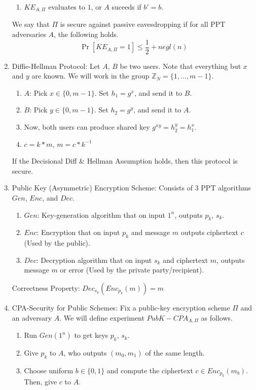 \documentclass[12pt,letterpaper]{article}
\begin{document}
\begin{enumerate}
\begin{enumerate}
   			\item $KE_{A,\Pi}$ evaluates to $1$, or $A$ suceeds if $b'=b$.
   		\end{enumerate}
   		We say that $\Pi$ is secure against passive eavesdropping if for all PPT adversaries $A$, the following holds.
   		\[\Pr[KE_{A,\Pi}=1]\leq\frac{1}{2}+negl(n)\]\newpage
   		\item Diffie-Hellman Protocol: Let $A$, $B$ be two users. Note that everything but $x$ and $y$ are known. We will work in the group $\mathbb{Z}_N=\{1,\ldots,m-1\}$.
   		\begin{enumerate}
   			\item $A$: Pick $x\in\{0,m-1\}$. Set $h_1=g^x$, and send it to $B$.
   			\item $B$: Pick $y\in\{0,m-1\}$. Set $h_2=g^y$, and send it to $A$.
   			\item Now, both users can produce shared key $g^{xy}=h_2^y=h_1^x$.
   			\item $c=k*m$, $m=c*k^{-1}$
   		\end{enumerate}
   		If the Decisional Diff \& Hellman Assumption holds, then this protocol is secure.
   		\item Public Key (Asymmetric) Encryption Scheme: Consists of 3 PPT algorithms $Gen$, $Enc$, and $Dec$.
   		\begin{enumerate}
   			\item $Gen$: Key-generation algorithm that on input $1^n$, outputs $p_k$, $s_k$.
   			\item $Enc$: Encryption that on input $p_k$ and message $m$ outputs ciphertext $c$ (Used by the public).
   			\item $Dec$: Decryption algorithm that on input $s_k$ and ciphertext $m$, outputs message $m$ or error (Used by the private party/recipient).
   		\end{enumerate}
   		Correctness Property: $Dec_{s_k}(Enc_{p_k}(m))=m$
   		\item CPA-Security for Public Schemes:
   		Fix a public-key encryption scheme $\Pi$ and an adversary $A$. We will define experiment $PubK-CPA_{A,\Pi}$ as follows.
   		\begin{enumerate}
   			\item Run $Gen(1^n)$ to get keys $p_k$, $s_k$.
   			\item Give $p_k$ to $A$, who outputs $(m_0,m_1)$ of the same length.
   			\item Choose uniform $b\in\{0,1\}$ and compute the ciphertext $c\in Enc_{p_k}(m_b)$. Then, give $c$ to $A$.

\end{enumerate}
\end{enumerate}
\end{document}
